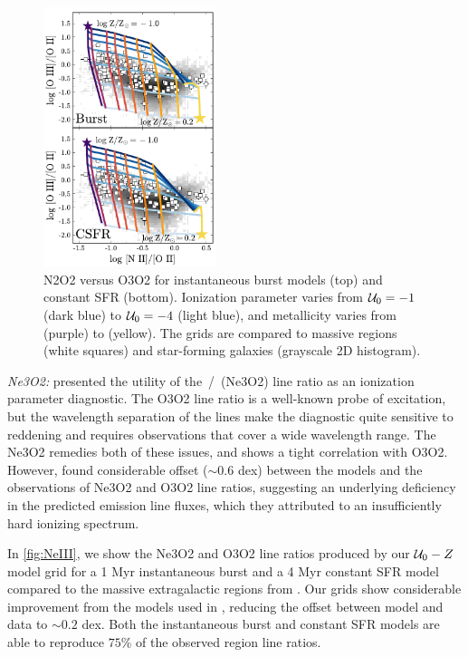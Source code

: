 \begin{figure}[!htbp]
  \begin{centering}
    \includegraphics[width=0.45\textwidth]{manuscript/chapter2/f19.pdf}
    \caption{N2O2 versus O3O2 for instantaneous burst models (top) and constant SFR (bottom). Ionization parameter varies from $\mathcal{U}_{0}=-1$ (dark blue) to $\mathcal{U}_{0}=-4$ (light blue), and metallicity varies from  (purple) to  (yellow). The grids are compared to massive \hii regions (white squares) and star-forming galaxies (grayscale 2D histogram).}
    \label{fig:NIIOII}
  \end{centering}
\end{figure}

{\it Ne3O2:} \citet{Levesque14} presented the utility of the \neiii{}\,/\,\oii{} (Ne3O2) line ratio as an ionization parameter diagnostic. The O3O2 line ratio is a well-known probe of excitation, but the wavelength separation of the lines make the diagnostic quite sensitive to reddening and requires observations that cover a wide wavelength range. The Ne3O2 remedies both of these issues, and shows a tight correlation with O3O2. However, \citet{Levesque14} found considerable offset (${\sim}0.6$ dex) between the models and the observations of Ne3O2 and O3O2 line ratios, suggesting an underlying deficiency in the predicted emission line fluxes, which they attributed to an insufficiently hard ionizing spectrum. 

In \ref{fig:NeIII}, we show the Ne3O2 and O3O2 line ratios produced by our $\mathcal{U}_{0}-Z$ model grid for a 1 Myr instantaneous burst and a 4 Myr constant SFR model compared to the massive extragalactic \hii regions from \citet{vanzee98}. Our grids show considerable improvement from the models used in \citet{Levesque14}, reducing the offset between model and data to $\sim 0.2$ dex. Both the instantaneous burst and constant SFR models are able to reproduce $75\%$ of the observed \hii region line ratios.

